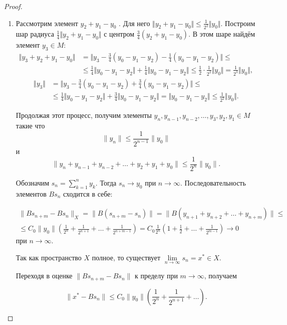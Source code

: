 \documentclass[12pt,a4paper,titlepage,oneside]{book}
\theoremstyle{definition}
\theoremstyle{plain}
\theoremstyle{break}
\theoremstyle{remark}
\theoremstyle{remark}
\theoremstyle{remark}
\theoremstyle{remark}
\theoremstyle{plain}
\theoremstyle{plain}
\begin{document}
\begin{proof}
\begin{enumerate}
	\item Рассмотрим элемент $y_2+y_1- y_0$ . Для него $\Vert y_2+y_1- y_0 \Vert \leqslant \frac{1}{2^2} \Vert y_0 \Vert$.
	Построим шар радиуса
	$\frac{1}{4} \Vert y_2 + y_1 - y_0 \Vert$      	с центром $\frac{3}{4}(y_2 + y_1 - y_0)$.
	В этом шаре найдём элемент 	$y_3 \in M$:
	\begin{align*}
	\Vert y_3 + y_2 + y_1 - y_0 \Vert &= \Vert y_3 - \frac{3}{4}(y_0 - y_1 - y_2) - \frac{1}{4}(y_0 - y_1 - y_2) \Vert \leqslant \\
	&\leqslant \frac{1}{4} \Vert y_0 - y_1 - y_2 \Vert + \frac{1}{4} \Vert y_0 - y_1 - y_2 \Vert \leqslant\frac{1}{2} \cdot \frac{1}{2^2} \Vert y_0 \Vert = \frac{1}{2^3} \Vert y_0 \Vert,
	\end{align*}
	\begin{align*}
	\Vert y_3 \Vert &=
	\Vert y_3 - \frac{3}{4}(y_0 - y_1 - y_2) +
	\frac{3}{4}(y_0 - y_1 - y_2) \Vert \leqslant \\
	&\leqslant \frac{1}{4} \Vert y_0 - y_1 - y_2 				\Vert +
	\frac{3}{4} \Vert y_0 - y_1 - y_2 \Vert =
	 \Vert y_0 - y_1 - y_2 \Vert \leqslant
	 \frac{1}{2^2} \Vert y_0 \Vert.
	\end{align*}

Продолжая этот процесс, получим элементы $y_n, y_{n-1}, y_{n-2}, \ldots, y_3, y_2, y_1 \in M$ такие что 
$$\lVert y_n \rVert \leqslant \frac{1}{2^{n-1}} \lVert y_0 \rVert$$
и
$$\lVert y_n + y_{n-1}+y_{n-2}+\ldots+y_2+y_1+y_0 \rVert \leqslant \frac{1}{2^n} \lVert y_0 \rVert.$$

Обозначим $s_n= \displaystyle\sum\limits_{k=1}^n y_k$. Тогда $s_n \to y_0$ при $n \to \infty$. Последовательность элементов $B s_n$ сходится в себе:

\begin{align*}
\lVert B s_{n+m}-B s_n \rVert _X = \lVert B(s_{n+m}-s_n) \rVert= \lVert B(y_{n+1}+y_{n+2}+\ldots+y_{n+m}) \rVert \leqslant \\
\leqslant C_0 \lVert y_0 \rVert (\frac{1}{2^n} + \frac{1}{2^{n+1}}+\ldots+\frac{1}{2^{n+m-1}})=C_0 \frac{1}{2^n} (1 + \frac{1}{2}+\ldots+\frac{1}{2^{m-1}}) \to 0
\end{align*}
при $n \to \infty$.

Так как пространство $X$ полное, то существует $\lim \limits_{n \to \infty} s_n=x^* \in X$.

Переходя в оценке $ \lVert B s_{n+m}-B s_n \rVert$ к пределу при $m \to \infty$, получаем

$$\lVert x^*-B s_n \rVert \leqslant C_0 \lVert y_0\rVert (\frac{1}{2^n} + \frac{1}{2^{n+1}}+\ldots).$$


\end{enumerate}
\end{proof}
\end{document}

